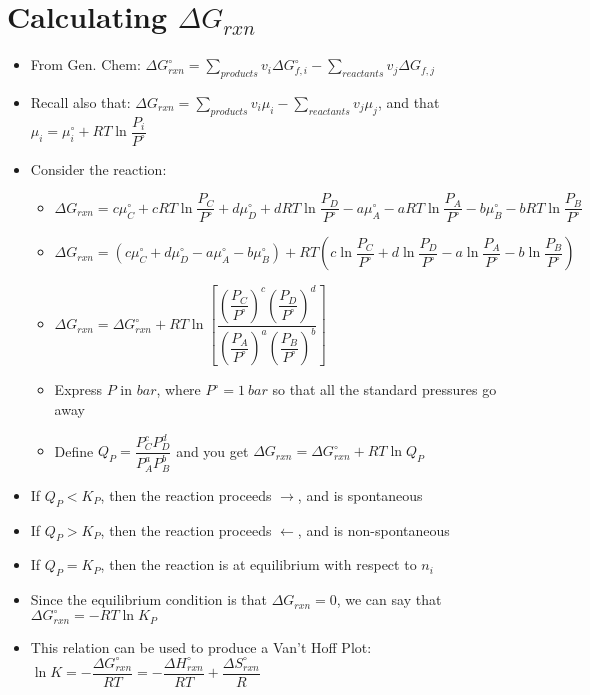 \documentclass[12pt, openany, letterpaper]{memoir}
\begin{document}
\section*{Calculating $\Delta G_{rxn}$}
\begin{itemize}
	\item From Gen. Chem: $ \Delta G_{rxn}^\circ = \sum\limits_{products}v_i\Delta G_{f,i}^\circ - \sum\limits_{reactants} v_j\Delta G_{f,j}$
	\item Recall also that: $\Delta G_{rxn} = \sum\limits_{products}v_i\mu_i - \sum\limits_{reactants} v_j\mu_j$, and that $\mu_i = \mu_i^\circ + RT\ln\dfrac{P_i}{P^\circ}$
	\item Consider the reaction: 
	\begin{itemize}
		\item $\Delta G_{rxn} = c\mu_C^\circ+ cRT\ln\dfrac{P_C}{P^\circ} + d\mu_D^\circ+ dRT\ln\dfrac{P_D}{P^\circ} - a\mu_A^\circ- aRT\ln\dfrac{P_A}{P^\circ} - b\mu_B^\circ- bRT\ln\dfrac{P_B}{P^\circ}$
		\item $\Delta G_{rxn} = \left(c\mu_C^\circ + d\mu_D^\circ- a\mu_A^\circ- b\mu_B^\circ\right) + RT\left(c\ln\dfrac{P_C}{P^\circ} + d\ln\dfrac{P_D}{P^\circ} - a\ln\dfrac{P_A}{P^\circ}- b\ln\dfrac{P_B}{P^\circ}\right)$
		\item $\Delta G_{rxn} = \Delta G_{rxn}^\circ + RT\ln\left[\dfrac{\left(\dfrac{P_C}{P^\circ}\right)^c\left(\dfrac{P_D}{P^\circ}\right)^d}{\left(\dfrac{P_A}{P^\circ}\right)^a\left(\dfrac{P_B}{P^\circ}\right)^b}\right]$
		\item Express $P$ in $bar$, where $P^\circ=1~bar$ so that all the standard pressures go away
		\item Define $Q_P = \dfrac{P_C^cP_D^d}{P_A^aP_B^b}$ and you get $\Delta G_{rxn} = \Delta G_{rxn}^\circ + RT\ln Q_P$
	\end{itemize}
	\item If $Q_P<K_P$, then the reaction proceeds $\rightarrow$, and is spontaneous
	\item If $Q_P>K_P$, then the reaction proceeds $\leftarrow$, and is non-spontaneous
	\item If $Q_P=K_P$, then the reaction is at equilibrium with respect to $n_i$
	\item Since the equilibrium condition is that $\Delta G_{rxn} =0$, we can say that $\Delta G_{rxn}^\circ = -RT\ln K_P$
	\item This relation can be used to produce a Van't Hoff Plot: $\ln K = -\dfrac{\Delta G_{rxn}^\circ}{RT} = -\dfrac{\Delta H_{rxn}^\circ}{RT} + \dfrac{\Delta S_{rxn}^\circ}{R}$
\end{itemize}
\end{document}
